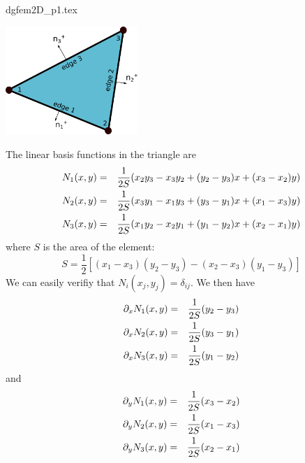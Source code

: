 \begin{flushright} {\tiny {\color{gray} dgfem2D\_p1.tex}} \end{flushright}

\begin{center}
\includegraphics[width=5cm]{images/dgfem/dgelts_p1}
\end{center}

The linear basis functions in the triangle are 
\begin{eqnarray}
N_1(x,y) &=& \frac{1}{2S} ( x_2y_3-x_3y_2+(y_2-y_3)x+(x_3-x_2)y   ) \nonumber\\
N_2(x,y) &=& \frac{1}{2S} ( x_3y_1-x_1y_3+(y_3-y_1)x+(x_1-x_3)y   ) \nonumber\\
N_3(x,y) &=& \frac{1}{2S} ( x_1y_2-x_2y_1+(y_1-y_2)x+(x_2-x_1)y   ) \nonumber
\end{eqnarray}
where $S$ is the area of the element:
\[
S= \frac{1}{2} [(x_1-x_3)(y_2-y_3)-(x_2-x_3)(y_1-y_3)]
\]
We can easily verifiy that $N_i(x_j,y_j)=\delta_{ij}$. We then have 
\begin{eqnarray}
\partial_x N_1(x,y) &=& \frac{1}{2S}  (y_2-y_3) \nonumber\\
\partial_x N_2(x,y) &=& \frac{1}{2S}  (y_3-y_1) \nonumber\\
\partial_x N_3(x,y) &=& \frac{1}{2S}  (y_1-y_2) \nonumber
\end{eqnarray}
and
\begin{eqnarray}
\partial_y N_1(x,y) &=& \frac{1}{2S}  (x_3-x_2) \nonumber\\
\partial_y N_2(x,y) &=& \frac{1}{2S}  (x_1-x_3) \nonumber\\
\partial_y N_3(x,y) &=& \frac{1}{2S}  (x_2-x_1) \nonumber
\end{eqnarray}

